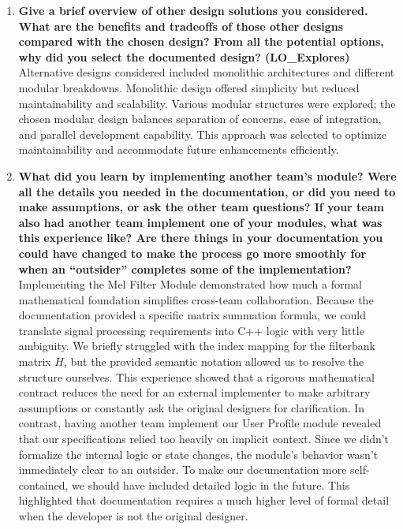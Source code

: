 \documentclass[12pt, titlepage]{article}
\begin{document}
\begin{enumerate}
  \item \textbf{Give a brief overview of other design solutions you considered. What are the benefits and tradeoffs of those other designs compared with the chosen design? From all the potential options, why did you select the documented design? (LO\_Explores)}  
  Alternative designs considered included monolithic architectures and different modular breakdowns. Monolithic design offered simplicity but reduced maintainability and scalability. Various modular structures were explored; the chosen modular design balances separation of concerns, ease of integration, and parallel development capability. This approach was selected to optimize maintainability and accommodate future enhancements efficiently.

  \item \textbf{What did you learn by implementing another team's module? Were all the details you needed in the documentation, or did you need to make assumptions, or ask the other team questions?  If your team also had another team implement one of your modules, what was this experience like?  Are there things in your documentation you could have changed to make the process go more smoothly for when an ``outsider'' completes some of the implementation?}
  Implementing the Mel Filter Module demonstrated how much a formal mathematical foundation simplifies cross-team collaboration. Because the documentation provided a specific matrix summation formula, we could translate signal processing requirements into C++ logic with very little ambiguity. We briefly struggled with the index mapping for the filterbank matrix $H$, but the provided semantic notation allowed us to resolve the structure ourselves. This experience showed that a rigorous mathematical contract reduces the need for an external implementer to make arbitrary assumptions or constantly ask the original designers for clarification.
  In contrast, having another team implement our User Profile module revealed that our specifications relied too heavily on implicit context. Since we didn't formalize the internal logic or state changes, the module's behavior wasn't immediately clear to an outsider. To make our documentation more self-contained, we should have included detailed logic in the future. This highlighted that documentation requires a much higher level of formal detail when the developer is not the original designer.



\end{enumerate}
\end{document}
